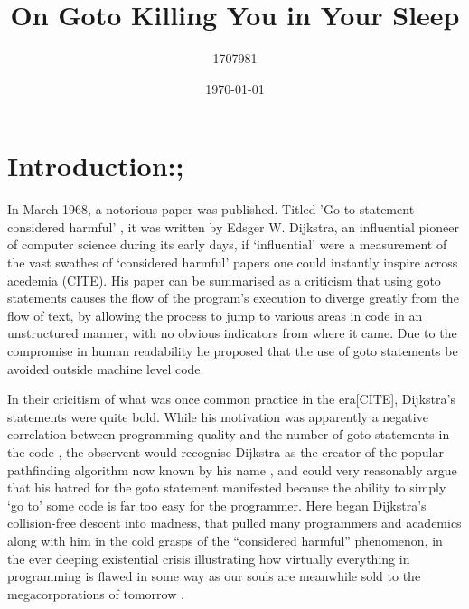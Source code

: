 \documentclass{journal}
\title{On Goto Killing You in Your Sleep}
\author{1707981}
\date{\today}
\begin{document}
\maketitle


\section{\textunderscore \textunderscore Introduction:;}
In March 1968, a notorious paper was published. Titled 'Go to statement considered harmful' \cite{goto}, it was written by Edsger W. Dijkstra, an influential pioneer of computer science during its early days, if `influential' were a measurement of the vast swathes of `considered harmful' papers one could instantly inspire across acedemia (CITE). His paper can be summarised as a criticism that using goto statements causes the flow of the program's execution to diverge greatly from the flow of text, by allowing the process to jump to various areas in code in an unstructured manner, with no obvious indicators from where it came. Due to the compromise in human readability he proposed that the use of goto statements be avoided outside machine level code.

In their cricitism of what was once common practice in the era[CITE], Dijkstra's statements were quite bold. While his motivation was apparently a negative correlation between programming quality and the number of goto statements in the code \cite{goto}, the observent would recognise Dijkstra as the creator of the popular pathfinding algorithm now known by his name \cite{pathfinding}, and could very reasonably argue that his hatred for the goto statement manifested because the ability to simply `go to' some code is far too easy for the programmer. Here began Dijkstra's collision-free descent into madness, that pulled many programmers and academics along with him in the cold grasps of the ``considered harmful'' phenomenon, in the ever deeping existential crisis illustrating how virtually everything in programming is flawed in some way as our souls are meanwhile sold to the megacorporations of tomorrow \cite{truths}.
\end{document}
